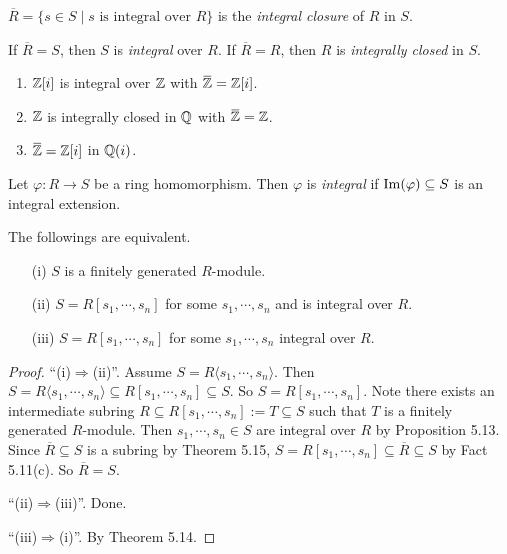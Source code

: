 \begin{definition}
    $\overbar{R} = \{s \in S \mid s \text{ is integral over }R\}$ is the \emph{integral closure} of $R$ in $S$. \par 
    If $\overbar{R} = S$, then $S$ is \emph{integral} over $R$. If $\overbar{R} = R$, then $R$ is \emph{integrally closed} in $S$.
\end{definition}

\begin{example}
    \begin{enumerate}
        \item $\mathbb{Z}[i]$ is integral over $\mathbb{Z}$ with $\overbar{\bbZ} = \bbZ[i]$.
        \item $\mathbb{Z}$ is integrally closed in $\mathbb{Q}$ with $\overbar{\bbZ} = \bbZ$. 
        \item $\overbar{\bbZ} = \bbZ[i]$ in $\mathbb{Q}(i)$.
    \end{enumerate}
\end{example}

\begin{definition}
    Let $\varphi: R \to S$ be a ring homomorphism. Then $\varphi$ is \emph{integral} if $\operatorname{Im}(\varphi) \subseteq S$ is an integral extension.
\end{definition}

\begin{theorem}
    The followings are equivalent.
    \begin{enumerate}
        \item[(i)]
            $S$ is a finitely generated $R$-module.
        \item[(ii)]
            $S = R[s_1,\cdots,s_n]$ for some $s_1,\cdots,s_n$ and is integral over $R$. 
        \item[(iii)] $S = R[s_1,\cdots,s_n]$ for some $s_1,\cdots,s_n$ integral over $R$.
    \end{enumerate}
\end{theorem}

\begin{proof}
    ``(i)$\Rightarrow$(ii)''. Assume $S = R\langle s_1,\cdots,s_n \rangle$. Then $S = R\langle s_1,\cdots,s_n \rangle \subseteq R[s_1,\cdots,s_n] \subseteq S$. So $S = R[s_1,\cdots,s_n]$. Note there exists an intermediate subring $R \subseteq R[s_1,\cdots,s_n] := T \subseteq S$ such that $T$ is a finitely generated $R$-module. Then $s_1,\cdots,s_n \in S$ are integral over $R$ by Proposition 5.13. Since $\overbar{R} \subseteq S$ is a subring by Theorem 5.15, $S = R[s_1,\cdots,s_n] \subseteq \overbar{R} \subseteq S$ by Fact 5.11(c). So $\overbar{R} = S$. \par
    ``(ii)$\Rightarrow$(iii)''. Done. \par 
    ``(iii)$\Rightarrow$(i)''. By Theorem 5.14.
\end{proof}


